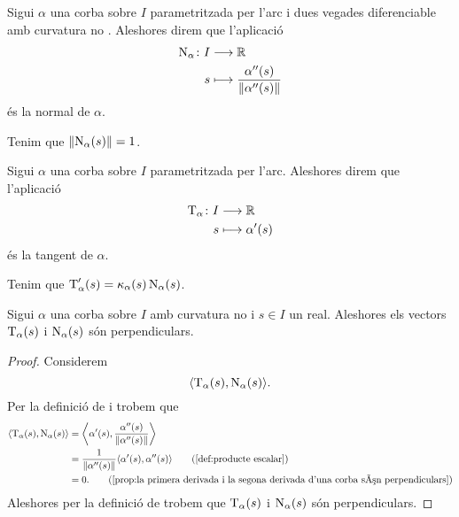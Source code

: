 \documentclass[../../Main.tex]{subfiles}
\begin{document}
	\begin{definition}[Normal]
		\label{def:normal}
		Sigui \(\alpha\) una corba sobre \(I\) parametritzada per l'arc i dues vegades diferenciable amb curvatura no \nulla{}. Aleshores direm que l'aplicació
		\begin{align*}
			\normal_{\alpha}\colon I&\longrightarrow\mathbb{R} \\
			s&\longmapsto\frac{\alpha''(s)}{\norm{\alpha''(s)}}
		\end{align*}
		és la normal de \(\alpha\).
	\end{definition}
	\begin{observation}
		\label{obs:la normal a una corba és unitària}
		Tenim que \(\norm{\normal_{\alpha}(s)}=1\).
	\end{observation}
	\begin{definition}[Tangent]
		\label{def:tangent}
		Sigui \(\alpha\) una corba sobre \(I\) parametritzada per l'arc. Aleshores direm que l'aplicació
		\begin{align*}
			\operatorname{T}_{\alpha}\colon I&\longrightarrow\mathbb{R} \\
			s&\longmapsto\alpha'(s)
		\end{align*}
		és la tangent de \(\alpha\).
	\end{definition}
	\begin{observation}
		\label{obs:la derivada de la tangent és la curvatura per la normal}
		Tenim que \(\operatorname{T}_{\alpha}'(s)=\operatorname{\kappa}_{\alpha}(s)\operatorname{N}_{\alpha}(s)\).
	\end{observation}
	\begin{proposition}
		\label{prop:la tangent i la normal d'una corba amb curvatura no nula són perpendiculars}
		Sigui \(\alpha\) una corba sobre \(I\) amb curvatura no \nulla{} i \(s\in I\) un real. Aleshores els vectors \(\operatorname{T}_{\alpha}(s)\) i \(\operatorname{N}_{\alpha}(s)\) són perpendiculars.
		\begin{proof}
			Considerem
			\[
			    \prodesc{\tangent_{\alpha}(s)}{\normal_{\alpha}(s)}.
			\]
			Per la definició de  i  trobem que
			\begin{align*}
				\prodesc{\tangent_{\alpha}(s)}{\normal_{\alpha}(s)}&=\prodesc[\bigg]{\alpha'(s)}{\frac{\alpha''(s)}{\norm{\alpha''(s)}}} \\
				&=\frac{1}{\norm{\alpha''(s)}}\prodesc{\alpha'(s)}{\alpha''(s)} \tag{\ref{def:producte escalar}} \\
				&=0. \tag{\ref{prop:la primera derivada i la segona derivada d'una corba són perpendiculars}}
			\end{align*}
			Aleshores per la definició de  trobem que \(\operatorname{T}_{\alpha}(s)\) i \(\operatorname{N}_{\alpha}(s)\) són perpendiculars.
		\end{proof}
	\end{proposition}
\end{document}
